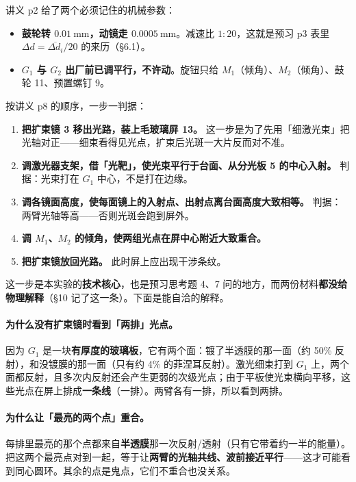 \documentclass[11pt]{ctexart}
\begin{document}
讲义 p2 给了两个必须记住的机械参数：

\begin{itemize}
\item \textbf{鼓轮转 \(0.01\ \mathrm{mm}\)，动镜走 \(0.0005\ \mathrm{mm}\)}。减速比 \(1:20\)，这就是预习 p3 表里 \(\Delta d=\overline{\Delta d_i}/20\) 的来历（§6.1）。
\item \textbf{\(G_1\) 与 \(G_2\) 出厂前已调平行，不许动}。旋钮只给 \(M_1\)（倾角）、\(M_2\)（倾角）、鼓轮 11、预置螺钉 9。
\end{itemize}


按讲义 p8 的顺序，一步一判据：

\begin{enumerate}
\item \textbf{把扩束镜 3 移出光路，装上毛玻璃屏 13。} 这一步是为了先用「细激光束」把光轴对正——细束看得见光点，扩束后光斑一大片反而对不准。
\item \textbf{调激光器支架，借「光靶」，使光束平行于台面、从分光板 5 的中心入射。} 判据：光束打在 \(G_1\) 中心，不是打在边缘。
\item \textbf{调各镜面高度，使每面镜上的入射点、出射点离台面高度大致相等。} 判据：两臂光轴等高——否则光斑会跑到屏外。
\item \textbf{调 \(M_1\)、\(M_2\) 的倾角，使两组光点在屏中心附近大致重合。}
\item \textbf{把扩束镜放回光路。} 此时屏上应出现干涉条纹。
\end{enumerate}


这一步是本实验的\textbf{技术核心}，也是预习思考题 4、7 问的地方，而两份材料\textbf{都没给物理解释}（§10 记了这一条）。下面是能自洽的解释。

\paragraph{为什么没有扩束镜时看到「两排」光点。}因为 \(G_1\) 是一块\textbf{有厚度的玻璃板}，它有两个面：镀了半透膜的那一面（约 50\% 反射），和没镀膜的那一面（只有约 4\% 的菲涅耳反射）。激光细束打到 \(G_1\) 上，两个面都反射，且多次内反射还会产生更弱的次级光点；由于平板使光束横向平移，这些光点在屏上排成\textbf{一条线}（一排）。两臂各有一排，所以看到两排。

\paragraph{为什么让「最亮的两个点」重合。}每排里最亮的那个点都来自\textbf{半透膜}那一次反射/透射（只有它带着约一半的能量）。把这两个最亮点对到一起，等于让\textbf{两臂的光轴共线、波前接近平行}——这才可能看到同心圆环。其余的点是鬼点，它们不重合也没关系。
\end{document}
